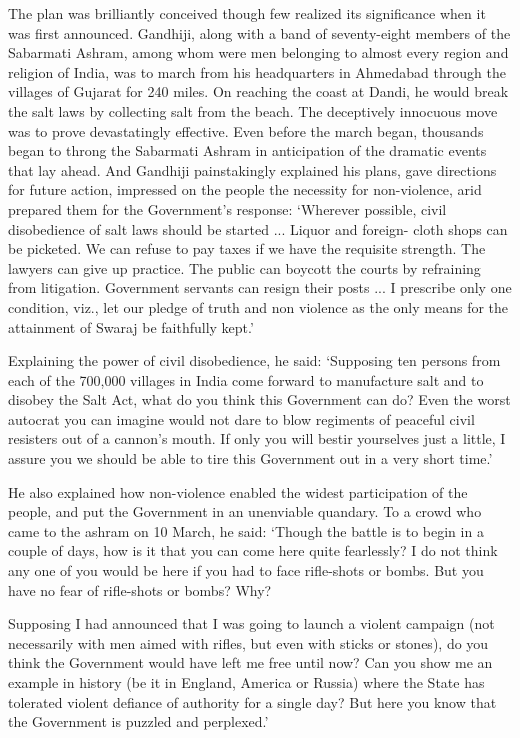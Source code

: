 The plan was brilliantly conceived though few realized its significance when it was first announced. Gandhiji, along with a band of seventy-eight members of the Sabarmati Ashram, among whom were men belonging to almost every region and religion of India, was to march from his headquarters in Ahmedabad through the villages of Gujarat for 240 miles. On reaching the coast at Dandi, he would break the salt laws by collecting salt from the beach. The deceptively innocuous move was to prove devastatingly effective. Even before the march began, thousands began to throng the Sabarmati Ashram in anticipation of the dramatic events that lay ahead. And Gandhiji painstakingly explained his plans, gave directions for future action, impressed on the people the necessity for non-violence, arid prepared them for the Government's response: `Wherever possible, civil disobedience of salt laws should be started ... Liquor and foreign- cloth shops can be picketed. We can refuse to pay taxes if we have the requisite strength. The lawyers can give up practice. The public can boycott the courts by refraining from litigation. Government servants can resign their posts ... I prescribe only one condition, viz., let our pledge of truth and non­ violence as the only means for the attainment of Swaraj be faithfully kept.' 

Explaining the power of civil disobedience, he said: `Supposing ten persons from each of the 700,000 villages in India come forward to manufacture salt and to disobey the Salt Act, what do you think this Government can do? Even the worst autocrat you can imagine would not dare to blow regiments of peaceful civil resisters out of a cannon's mouth. If only you will bestir yourselves just a little, I assure you we should be able to tire this Government out in a very short time.' 

He also explained how non-violence enabled the widest participation of the people, and put the Government in an unenviable quandary. To a crowd who came to the ashram on 10 March, he said: `Though the battle is to begin in a couple of days, how is it that you can come here quite fearlessly? I do not think any one of you would be here if you had to face rifle-shots or bombs. But you have no fear of rifle-shots or bombs? Why? 

Supposing I had announced that I was going to launch a violent campaign (not necessarily with men aimed with rifles, but even with sticks or stones), do you think the Government would have left me free until now? Can you show me an example in history (be it in England, America or Russia) where the State has tolerated violent defiance of authority for a single day? But here you know that the Government is puzzled and perplexed.' 

